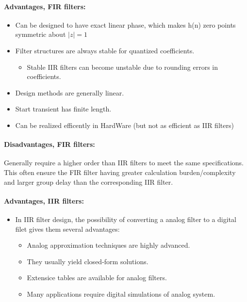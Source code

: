 \documentclass{article}
\begin{document}
\paragraph{Advantages, FIR filters:}
\begin{itemize}
    \item Can be designed to have exact linear phase, which makes h(n) zero points symmetric about $|z| = 1$
    \item  Filter structures are always stable for quantized coefficients.
    \begin{itemize}
        \item Stable IIR filters can become unstable due to rounding errors in coefficients.
    \end{itemize}
    \item Design methods are generally linear. 
    \item Start transient has finite length.
    \item Can be realized efficently in HardWare (but not as efficient as IIR filters)
\end{itemize}

\paragraph{Disadvantages, FIR filters:}

Generally require a higher order than IIR filters to meet the same specifications. This often ensure the FIR filter having greater calculation burden/complexity and larger group delay than the corresponding IIR filter.

\paragraph{Advantages, IIR filters:}
\begin{itemize}
    \item In IIR filter design, the possibility of converting a analog filter to a digital filet gives them several advantages:
    \begin{itemize}
        \item Analog approximation techniques are highly advanced.
        \item They usually yield closed-form solutions.
        \item Extensice tables are available for analog filters.
        \item Many applications require digital simulations of analog system.
    \end{itemize}
\end{itemize}
\end{document}
